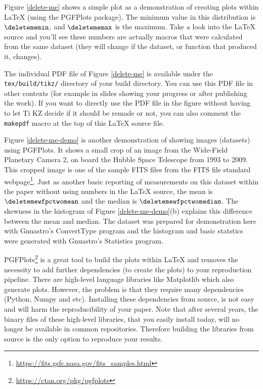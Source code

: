 \documentclass[10pt, twocolumn]{article}
\begin{document}
Figure \ref{delete-me} shows a simple plot as a demonstration of creating
plots within \LaTeX{} (using the {\small PGFP}lots package). The minimum
value in this distribution is $\deletememin$, and $\deletememax$ is the
maximum. Take a look into the \LaTeX{} source and you'll see these numbers
are actually macros that were calculated from the same dataset (they will
change if the dataset, or function that produced it, changes).

The individual {\small PDF} file of Figure \ref{delete-me} is available
under the \texttt{tex/build/tikz/} directory of your build directory. You
can use this PDF file in other contexts (for example in slides showing your
progress or after publishing the work). If you want to directly use the
{\small PDF} file in the figure without having to let {\small T}i{\small
  KZ} decide if it should be remade or not, you can also comment the
\texttt{makepdf} macro at the top of this \LaTeX{} source file.

\begin{figure}[t]

\end{figure}

Figure \ref{delete-me-demo} is another demonstration of showing images
(datasets) using PGFPlots. It shows a small crop of an image from the
Wide-Field Planetary Camera 2, on board the Hubble Space Telescope from
1993 to 2009. This cropped image is one of the sample FITS files from the
FITS file standard
webpage\footnote{\url{https://fits.gsfc.nasa.gov/fits_samples.html}}. Just
as another basic reporting of measurements on this dataset within the paper
without using numbers in the \LaTeX{} source, the mean is
$\deletemewfpctwomean$ and the median is $\deletemewfpctwomedian$. The
skewness in the histogram of Figure \ref{delete-me-demo}(b) explains this
difference between the mean and median. The dataset was prepared for
demonstration here with Gnuastro's \textsf{Convert\-Type} program and the
histogram and basic statstics were generated with Gnuastro's
\textsf{Statistics} program.

{\small PGFP}lots\footnote{\url{https://ctan.org/pkg/pgfplots}} is a great
tool to build the plots within \LaTeX{} and removes the necessity to add
further dependencies (to create the plots) to your reproduction
pipeline. There are high-level language libraries like Matplotlib which
also generate plots. However, the problem is that they require many
dependencies (Python, Numpy and etc). Installing these dependencies from
source, is not easy and will harm the reproducibility of your paper. Note
that after several years, the binary files of these high-level libraries,
that you easily install today, will no longer be available in common
repositories. Therefore building the libraries from source is the only
option to reproduce your results.
\end{document}

